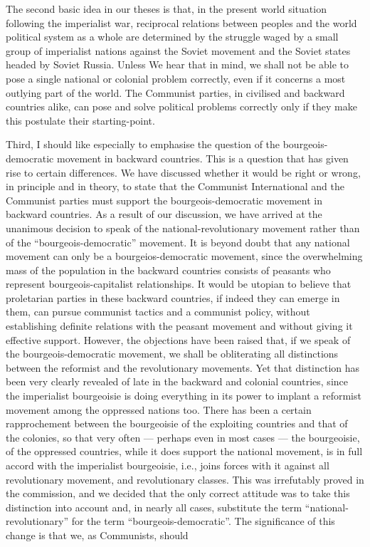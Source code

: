 The second basic idea in our theses is that, in the present world situation following the imperialist war, reciprocal relations between peoples and the world political system as a whole are determined by the struggle waged by a small group of imperialist nations against the Soviet movement and the Soviet states headed by Soviet Russia. Unless We hear that in mind, we shall not be able to pose a single national or colonial problem correctly, even if it concerns a most outlying part of the world. The Communist parties, in civilised and backward countries alike, can pose and solve political problems correctly only if they make this postulate their starting-point. 

Third, I should like especially to emphasise the question of the bourgeois-democratic movement in backward countries. This is a question that has given rise to certain differences. We have discussed whether it would be right or wrong, in principle and in theory, to state that the Communist International and the Communist parties must support the bourgeois-democratic movement in backward countries. As a result of our discussion, we have arrived at the unanimous decision to speak of the national-revolutionary movement rather than of the “bourgeois-democratic” movement. It is beyond doubt that any national movement can only be a bourgeios-democratic movement, since the overwhelming mass of the population in the backward countries consists of peasants who represent bourgeois-capitalist relationships. It would be utopian to believe that proletarian parties in these backward countries, if indeed they can emerge in them, can pursue communist tactics and a communist policy, without establishing definite relations with the peasant movement and without giving it effective support. However, the objections have been raised that, if we speak of the bourgeois-democratic movement, we shall be obliterating all distinctions between the reformist 
and the revolutionary movements. Yet that distinction has been very clearly revealed of late in the backward and colonial countries, since the imperialist bourgeoisie is doing everything in its power to implant a reformist movement among the oppressed nations too. There has been a certain rapprochement between the bourgeoisie of the exploiting countries and that of the colonies, so that very often — perhaps even in most 
cases — the bourgeoisie, of the oppressed countries, while it does support the national movement, is in full accord with the imperialist bourgeoisie, i.e., joins forces with it against all revolutionary movement, and revolutionary classes. This was irrefutably proved in the commission, and we decided that the only correct attitude was to take this distinction into account and, in nearly all cases, substitute the term “national- revolutionary” for the term “bourgeois-democratic”. The significance of this change is that we, as Communists, should 

